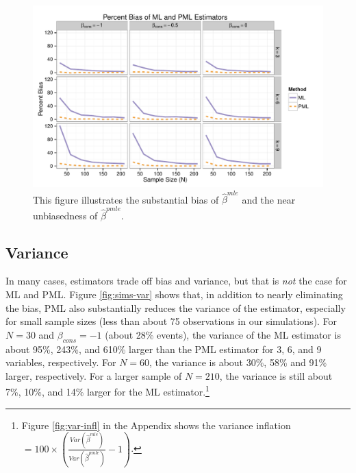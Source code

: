 \documentclass[12pt]{article}
\begin{document}
\begin{figure}[h]
\begin{center}
\includegraphics[width = \textwidth]{figs/sims-percent-bias.pdf}
\caption{This figure illustrates the substantial bias of $\hat{\beta}^{mle}$ and the near unbiasedness of $\hat{\beta}^{pmle}$.}\label{fig:sims-coef-perc-bias}
\end{center}
\end{figure}

\subsection*{Variance}

In many cases, estimators trade off bias and variance, but that is \textit{not} the case for ML and PML. 
Figure \ref{fig:sims-var} shows that, in addition to nearly eliminating the bias, PML also substantially reduces the variance of the estimator, especially for small sample sizes (less than about 75 observations in our simulations). 
For $N = 30$ and $\beta_{cons} = -1$ (about 28\% events), the variance of the ML estimator is about 95\%, 243\%, and 610\% larger than the PML estimator for 3, 6, and 9 variables, respectively. 
For $N = 60$, the variance is about 30\%, 58\% and 91\% larger, respectively. For a larger sample of $N = 210$, the variance is still about 7\%, 10\%, and 14\% larger for the ML estimator.\footnote{Figure \ref{fig:var-infl} in the Appendix shows the variance inflation $= 100 \times \left(\frac{Var(\hat{\beta} ^{mle})}{Var(\hat{\beta}^{pmle})} - 1\right)$.}
\end{document}
